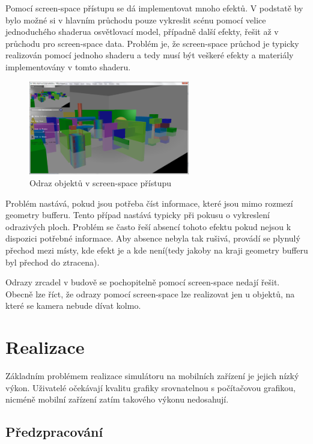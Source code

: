 \documentclass[11pt,twoside,a4paper]{book}
\begin{document}
Pomocí screen-space přístupu se dá implementovat mnoho efektů. V podstatě by bylo možné si v hlavním průchodu pouze vykreslit scénu pomocí velice jednoduchého shaderu\linebreak a osvětlovací model, případně další efekty, řešit až v průchodu pro screen-space data. Problém je, že screen-space průchod je typicky realizován pomocí jednoho shaderu a tedy musí být veškeré efekty a materiály implementovány v tomto shaderu.
\begin{center}
\begin{figure}[h!]
\includegraphics[width=70mm]{figures/screenspace.png}
\caption{Odraz objektů v screen-space přístupu}
\end{figure}
\end{center}

Problém nastává, pokud jsou potřeba číst informace, které jsou mimo rozmezí geometry bufferu. Tento případ nastává typicky při pokusu o vykreslení odrazivých ploch. Problém se často řeší absencí tohoto efektu pokud nejsou k dispozici potřebné informace. Aby absence nebyla tak rušivá, provádí se plynulý přechod mezi místy, kde efekt je a kde není(tedy jakoby na kraji geometry bufferu byl přechod do ztracena).

Odrazy zrcadel v budově se pochopitelně pomocí screen-space nedají řešit. Obecně lze říct, že odrazy pomocí screen-space lze realizovat jen u objektů, na které se kamera nebude dívat kolmo.

\chapter{Realizace}
Základním problémem realizace simulátoru na mobilních zařízení je jejich nízký výkon.
Uživatelé očekávají kvalitu grafiky srovnatelnou s počítačovou grafikou, nicméně mobilní zařízení zatím takového výkonu nedosahují.

\section{Předzpracování}
\end{document}
